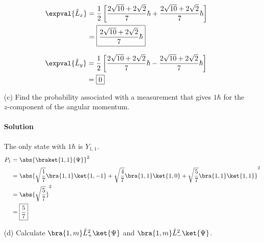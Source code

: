 \documentclass{article}
\begin{document}
\begin{enumerate}
		\begin{minipage}{0.45\textwidth}
			\begin{equation}
				\begin{split}
					\expval{\hat{L}_x} &= \frac{1}{2} \left[ \frac{2\sqrt{10} + 2\sqrt{2}}{7} \hbar + \frac{2\sqrt{10} + 2\sqrt{2}}{7} \hbar \right] \\
									   &= \boxed{\frac{2\sqrt{10} + 2\sqrt{2}}{7} \hbar}
				\end{split}
			\end{equation}
		\end{minipage}
		\begin{minipage}{0.45\textwidth}
			\begin{equation}
				\begin{split}
					\expval{\hat{L}_y} &= \frac{1}{2} \left[ \frac{2\sqrt{10} + 2\sqrt{2}}{7} \hbar - \frac{2\sqrt{10} + 2\sqrt{2}}{7} \hbar \right] \\
									   &= \boxed{0}
				\end{split}
			\end{equation}
		\end{minipage}
		
		\item[(c)] Find the probability associated with a measurement that gives $1\hbar$ for the $z$-component of the angular momentum.
		\paragraph{Solution} The only state with $1\hbar$ is $Y_{1,1}$.
		\begin{equation}
			\begin{aligned}[b]
				P_1 &= \abs{ \braket{1,1}{\Psi} }^2 \\
					&= \abs{ \sqrt{\frac{1}{7}} \bra{1,1}\ket{1,-1} + \sqrt{\frac{4}{7}} \bra{1,1}\ket{1,0} + \sqrt{\frac{5}{7}} \bra{1,1}\ket{1,1} }^2 \\
					&= \abs{ \sqrt{\frac{5}{7}} }^2 \\
					&= \boxed{\frac{5}{7}}
			\end{aligned}
		\end{equation}
		
		\item[(d)] Calculate $\bra{1,m}\hat{L}^2_+ \ket{\Psi}$ and $\bra{1,m}\hat{L}^2_- \ket{\Psi}$.

\end{enumerate}
\end{document}
